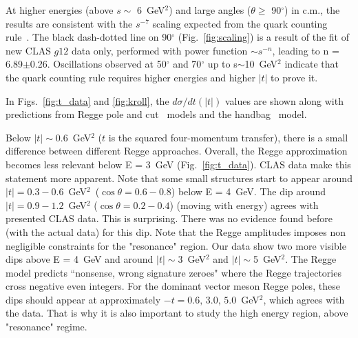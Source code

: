 \documentclass[aps,prc,twocolumn,floatfix,showpacs,preprintnumbers,amsmath,amssymb,superscriptaddress]{revtex4-1}
\begin{document}
At higher energies (above $s\sim$ 6~GeV$^2$) and large angles 
($\theta\geq$ 90$^\circ$) in c.m., the results are consistent 
with the $s^{-7}$ scaling expected from the quark counting 
rule~\cite{Stan}. The black dash-dotted line on 90$^\circ$ 
(Fig.~\ref{fig:scaling}) is a result of the fit of new CLAS 
$g12$ data only, performed with power function $\sim s^{-n}$, 
leading to n = 6.89$\pm$0.26.  Oscillations observed at 
50$^\circ$ and 70$^\circ$ up to s$\sim$10~GeV$^2$ indicate
that the quark counting rule requires higher energies and 
higher $|t|$ to prove it.

In Figs.~\ref{fig:t_data} and \ref{fig:kroll}, the 
$d\sigma/dt(|t|)$ values are shown along with predictions from Regge 
pole and cut~\cite{Goldstein,Laget,Mathieu,Donnachie} models and the
handbag~\cite{Kroll} model. 

Below $|t|\sim$0.6~GeV$^2$ ($t$ is the squared four-momentum 
transfer), there is a small difference between different Regge 
approaches.  Overall, the Regge approximation becomes less 
relevant below E = 3~GeV (Fig.~\ref{fig:t_data}).  CLAS data 
make this statement more apparent.  Note that some small 
structures start to appear around $|t| = 
0.3-0.6$~GeV$^2$~($\cos\theta = 0.6-0.8$) below E = 4~GeV.  The dip 
around $|t| = 0.9-1.2$~GeV$^2$ ($\cos\theta = 0.2-0.4$) (moving 
with energy) agrees with presented CLAS data.  This is surprising.  
There was no evidence found before (with the actual data) for 
this dip. Note that the Regge amplitudes imposes non negligible 
constraints for the "resonance" region.  Our data show two more 
visible dips above E = 4~GeV and around $|t|\sim$3~GeV$^2$ and 
$|t|\sim$5~GeV$^2$. The Regge model predicts ``nonsense, wrong 
signature zeroes" where the Regge trajectories cross negative 
even integers. For the dominant vector meson Regge poles, these 
dips should appear at approximately $-t=0.6, \, 3.0, \, 
5.0$~GeV$^2$,  which agrees with the data.  That is why 
it is also important to study the high energy region, above 
"resonance" regime.
\end{document}
